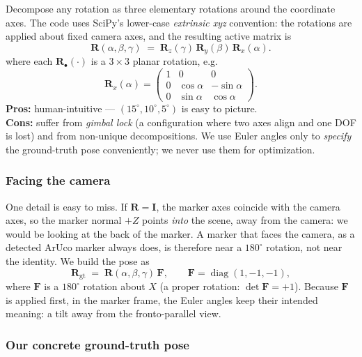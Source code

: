 \documentclass[11pt,a4paper]{article}
\theoremstyle{definition}
\theoremstyle{plain}
\theoremstyle{remark}
\newcommand{\Rgt}{\mathbf{R}_{\text{gt}}}
\begin{document}
Decompose any rotation as three elementary rotations around the coordinate
axes. The code uses SciPy's lower-case \emph{extrinsic xyz} convention: the
rotations are applied about fixed camera axes, and the resulting active
matrix is
\begin{equation}
  \mathbf{R}(\alpha,\beta,\gamma) \;=\; \mathbf{R}_z(\gamma)\,\mathbf{R}_y(\beta)\,\mathbf{R}_x(\alpha).
\end{equation}
where each $\mathbf{R}_\bullet(\cdot)$ is a $3\times 3$ planar rotation, e.g.
\begin{equation}
  \mathbf{R}_x(\alpha) =
  \begin{pmatrix} 1 & 0 & 0 \\ 0 & \cos\alpha & -\sin\alpha \\ 0 & \sin\alpha & \cos\alpha \end{pmatrix}.
\end{equation}
\textbf{Pros:} human-intuitive --- $(15^\circ, 10^\circ, 5^\circ)$ is easy to picture.\\
\textbf{Cons:} suffer from \emph{gimbal lock} (a configuration where two
axes align and one DOF is lost) and from non-unique decompositions. We use
Euler angles only to \emph{specify} the ground-truth pose conveniently; we
never use them for optimization.

\subsubsection{Facing the camera}

One detail is easy to miss. If $\mathbf{R} = \mathbf{I}$, the marker axes
coincide with the camera axes, so the marker normal $+Z$ points \emph{into}
the scene, away from the camera: we would be looking at the back of the
marker. A marker that faces the camera, as a detected ArUco marker always
does, is therefore near a $180^\circ$ rotation, not near the identity. We
build the pose as
\begin{equation}
  \Rgt \;=\; \mathbf{R}(\alpha,\beta,\gamma)\, \mathbf{F},
  \qquad
  \mathbf{F} = \operatorname{diag}(1,-1,-1),
  \label{eq:face-flip}
\end{equation}
where $\mathbf{F}$ is a $180^\circ$ rotation about $X$ (a proper rotation:
$\det \mathbf{F} = +1$). Because $\mathbf{F}$ is applied first, in the marker
frame, the Euler angles keep their intended meaning: a tilt away from the
fronto-parallel view.

\subsubsection{Our concrete ground-truth pose}
\label{sec:gt-pose}
\end{document}
